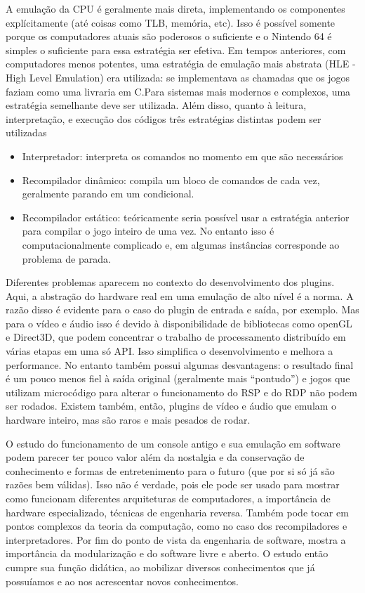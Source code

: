 \documentclass[12pt]{article}
\begin{document}
A emulação da CPU é geralmente mais direta, implementando os componentes explícitamente (até coisas como TLB, memória, etc). Isso é possível somente porque os computadores atuais são poderosos o suficiente e o Nintendo 64 é simples o suficiente para essa estratégia ser efetiva. Em tempos anteriores, com computadores menos potentes, uma estratégia de emulação mais abstrata (HLE - High Level Emulation) era utilizada: se implementava as chamadas que os jogos faziam como uma livraria em C\cite{HLE}.Para sistemas mais modernos e complexos, uma estratégia semelhante deve ser utilizada. Além disso, quanto à leitura, interpretação, e execução dos códigos três estratégias distintas podem ser utilizadas 
\begin{itemize}
\item{Interpretador}: interpreta os comandos no momento em que são necessários
\item{Recompilador dinâmico}: compila um bloco de comandos de cada vez, geralmente parando em um condicional.
\item{Recompilador estático}: teóricamente seria possível usar a estratégia anterior para compilar o jogo inteiro de uma vez. No entanto isso é computacionalmente complicado e, em algumas instâncias corresponde ao problema de parada.
\end{itemize}

Diferentes problemas aparecem no contexto do desenvolvimento dos plugins. Aqui, a abstração do hardware real em uma emulação de alto nível é a norma. A razão disso é evidente para o caso do plugin de entrada e saída, por exemplo. Mas para o vídeo e áudio isso é devido à disponibilidade de bibliotecas como openGL e Direct3D, que podem concentrar o trabalho de processamento distribuído em várias etapas em uma só API. Isso simplifica o desenvolvimento e melhora a performance. No entanto também possui algumas desvantagens: o resultado final é um pouco menos fiel à saída original (geralmente mais “pontudo”) e jogos que utilizam microcódigo para alterar o funcionamento do RSP e do RDP não podem ser rodados. Existem também, então, plugins de vídeo e áudio que emulam o hardware inteiro, mas são raros e mais pesados de rodar.


O estudo do funcionamento de um console antigo e sua emulação em software podem parecer ter pouco valor além da nostalgia e da conservação de conhecimento e formas de entretenimento para o futuro (que por si só já são razões bem válidas). Isso não é verdade, pois ele pode ser usado para mostrar como funcionam diferentes arquiteturas de computadores, a importância de hardware especializado, técnicas de engenharia reversa. Também pode tocar em pontos complexos da teoria da computação, como no caso dos recompiladores e interpretadores. Por fim do ponto de vista da engenharia de software, mostra a importância da modularização e do software livre e aberto. O estudo então cumpre sua função didática, ao mobilizar diversos conhecimentos que já possuíamos e ao nos acrescentar novos conhecimentos.
\end{document}
